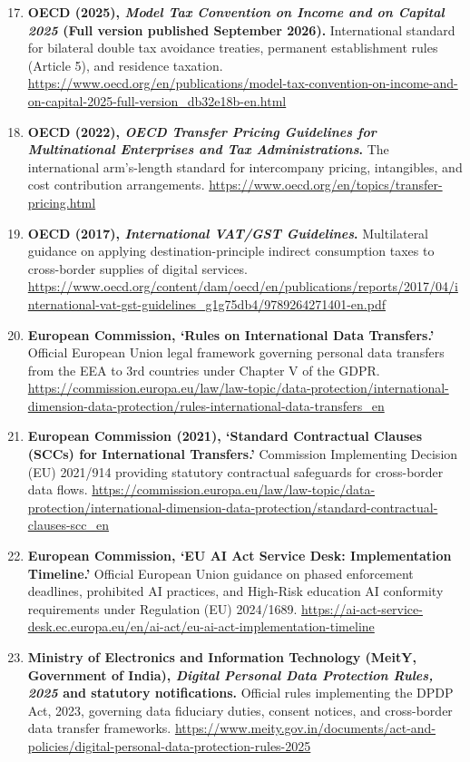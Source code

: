 \begin{enumerate}
    \setcounter{enumi}{16}
    \item \textbf{OECD (2025), \textit{Model Tax Convention on Income and on Capital 2025} (Full version published September 2026).} International standard for bilateral double tax avoidance treaties, permanent establishment rules (Article 5), and residence taxation. \url{https://www.oecd.org/en/publications/model-tax-convention-on-income-and-on-capital-2025-full-version_db32e18b-en.html}
    \item \textbf{OECD (2022), \textit{OECD Transfer Pricing Guidelines for Multinational Enterprises and Tax Administrations}.} The international arm's-length standard for intercompany pricing, intangibles, and cost contribution arrangements. \url{https://www.oecd.org/en/topics/transfer-pricing.html}
    \item \textbf{OECD (2017), \textit{International VAT/GST Guidelines}.} Multilateral guidance on applying destination-principle indirect consumption taxes to cross-border supplies of digital services. \url{https://www.oecd.org/content/dam/oecd/en/publications/reports/2017/04/international-vat-gst-guidelines_g1g75db4/9789264271401-en.pdf}
    \item \textbf{European Commission, `Rules on International Data Transfers.'} Official European Union legal framework governing personal data transfers from the EEA to 3rd countries under Chapter V of the GDPR. \url{https://commission.europa.eu/law/law-topic/data-protection/international-dimension-data-protection/rules-international-data-transfers_en}
    \item \textbf{European Commission (2021), `Standard Contractual Clauses (SCCs) for International Transfers.'} Commission Implementing Decision (EU) 2021/914 providing statutory contractual safeguards for cross-border data flows. \url{https://commission.europa.eu/law/law-topic/data-protection/international-dimension-data-protection/standard-contractual-clauses-scc_en}
    \item \textbf{European Commission, `EU AI Act Service Desk: Implementation Timeline.'} Official European Union guidance on phased enforcement deadlines, prohibited AI practices, and High-Risk education AI conformity requirements under Regulation (EU) 2024/1689. \url{https://ai-act-service-desk.ec.europa.eu/en/ai-act/eu-ai-act-implementation-timeline}
    \item \textbf{Ministry of Electronics and Information Technology (MeitY, Government of India), \textit{Digital Personal Data Protection Rules, 2025} and statutory notifications.} Official rules implementing the DPDP Act, 2023, governing data fiduciary duties, consent notices, and cross-border data transfer frameworks. \url{https://www.meity.gov.in/documents/act-and-policies/digital-personal-data-protection-rules-2025}

\end{enumerate}
